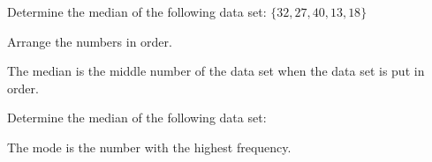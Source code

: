 \documentclass{ximera}
\begin{document}
\begin{question}
Determine the median of the following data set: $\{32, 27, 40, 13, 18\}$

    \begin{multipleChoice}
    \end{multipleChoice}
    \begin{hint}
      Arrange the numbers in order.
    \end{hint}
    \begin{hint}
      The median is the middle number of the data set when the data set is put in order.
    \end{hint}

\end{question}

\begin{question}
Determine the median of the following data set:
\begin{image}
\end{image}


    \begin{multipleChoice}
    \end{multipleChoice}
    \begin{hint}
      The mode is the number with the highest frequency.
    \end{hint}

\end{question}
\end{document}
